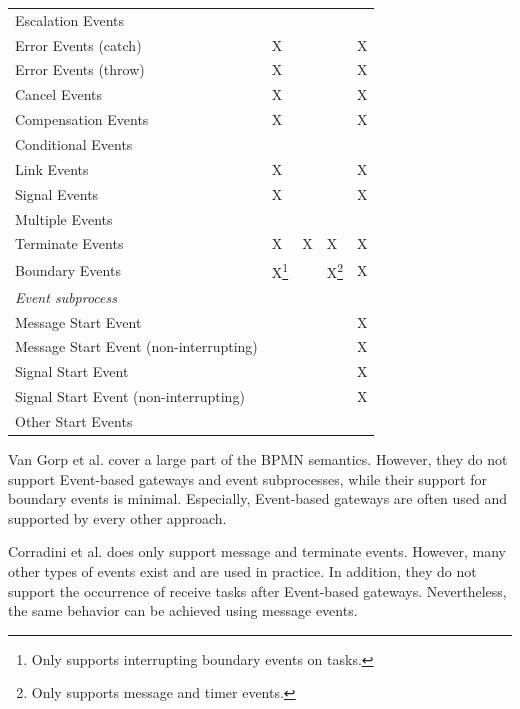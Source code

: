 \documentclass[adraft, copyright, creativecommons]{eptcs} %
\begin{document}
\begin{table}[htbp]
\begin{tabular}{l l l l l}
      Escalation Events & & & & \\
      Error Events (catch) & X & & & \color{yellow}X\\ %
      Error Events (throw) & X & & & \color{yellow}X\\
      Cancel Events & X & & & \color{yellow}X\\
      Compensation Events & X & & & \color{yellow}X\\
      Conditional Events & & & &\\
      Link Events & X & & & X\\
      Signal Events & X & & & X\\
      Multiple Events &  & & & \\
      Terminate Events & X & X & X & X\\
     Boundary Events & X\footnote{Only supports interrupting boundary events on tasks.} & & X\footnote{Only supports message and timer events.} & X\\ %
      \textit{Event subprocess} &  &  &  & \\
      Message Start Event &  & & & X\\
      Message Start Event (non-interrupting) & & & & X\\
      Signal Start Event &  & & & X\\
      Signal Start Event (non-interrupting) &  & & & X\\
      Other Start Events &  & & & \\ %
    \end{tabular}
\end{table}

Van Gorp et al. \cite{vangorpVisualTokenbasedFormalization2013} cover a large part of the BPMN semantics.
However, they do not support Event-based gateways and event subprocesses, while their support for boundary events is minimal.
Especially, Event-based gateways are often used and supported by every other approach.

Corradini et al. \cite{corradiniFormalApproachAnalysis2021} does only support message and terminate events.
However, many other types of events exist and are used in practice.
In addition, they do not support the occurrence of receive tasks after Event-based gateways.
Nevertheless, the same behavior can be achieved using message events.
\end{document}
